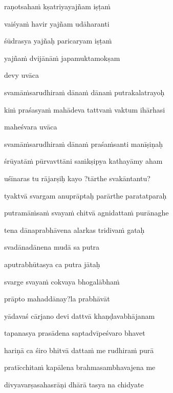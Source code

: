\ujvers\nemsloka 
raṇotsahaṁ kṣatriyayajñam iṣṭaṁ
\dontdisplaylinenum

\nemslokab 
vaiśyaṁ havir yajñam udāharanti \danda\dontdisplaylinenum

\nemslokac 
śūdrasya yajñaḥ paricaryam iṣṭaṁ
\dontdisplaylinenum

\nemslokad 
yajñaṁ dvijānāṁ japamuktamokṣam \veg\dontdisplaylinenum

\vers

devy uvāca~{\dandab}\dontdisplaylinenum 

svamāṁsarudhiraṁ dānaṁ dānaṁ putrakalatrayoḥ\thinspace{\danda} \dontdisplaylinenum

kiṁ praśasyaṁ mahādeva tattvaṁ vaktum ihārhasi \veg\dontdisplaylinenum

maheśvara uvāca~{\dandab}\dontdisplaylinenum 

svamāṁsarudhiraṁ dānaṁ praśaṁsanti manīṣiṇaḥ\thinspace{\danda} \dontdisplaylinenum

śrūyatāṁ pūrvavttāni saṁkṣipya kathayāmy aham \veg\dontdisplaylinenum

uśīnaras tu rājarṣiḥ kayo ?tārthe svakāntantu? \thinspace{\dandab} \dontdisplaylinenum

tyaktvā svargam anuprāptaḥ parārthe paratatparaḥ \veg\dontdisplaylinenum

putramāṁsaṁ svayaṁ chitvā agnidattaṁ purānaghe\thinspace{\dandab} \dontdisplaylinenum

tena dānaprabhāvena alarkas tridivaṁ gataḥ \veg\dontdisplaylinenum

\ujvers\nemsloka 
svadānadānena mudā sa putra
\dontdisplaylinenum

\nemslokab 
aputrabhūtasya ca putra jātaḥ \danda\dontdisplaylinenum

\nemslokac 
svarge svayaṁ cokvaya bhogalābhaṁ
\dontdisplaylinenum

\nemslokad 
prāpto mahaddānay?la prabhāvāt \veg\dontdisplaylinenum

\vers

yādavaś cārjano devi dattvā khaṇḍavabhājanam \veg\dontdisplaylinenum

tapanasya prasādena saptadvīpeśvaro bhavet\thinspace{\dandab} \dontdisplaylinenum

hariṇā ca śiro bhitvā dattaṁ me rudhiraṁ purā \veg\dontdisplaylinenum

pratīcchitaṁ kapālena brahmasambhavajena me\thinspace{\dandab} \dontdisplaylinenum

divyavarṣasahasrāṇi dhārā tasya na chidyate \veg\dontdisplaylinenum

